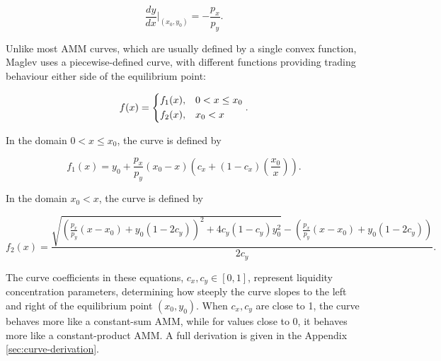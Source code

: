 \documentclass{article}
\begin{document}
\begin{equation}
\frac{dy}{dx} \Big|_{(x_0, y_0)} = -\frac{p_x}{p_y}.
\end{equation}

Unlike most AMM curves, which are usually defined by a single convex function, Maglev uses a piecewise-defined curve, with different functions providing trading behaviour either side of the equilibrium point:

\begin{equation}
    \label{eq:fx-main}
    f(x) =
    \begin{dcases}
        f_1(x), 
        & 0 < x \leq x_0 \\
        f_2(x), 
        & x_0 < x
    \end{dcases}.
\end{equation}

In the domain $0 < x \leq x_0$, the curve is defined by

\begin{equation}
    \label{eq:fx1-main}
    f_1(x) 
    =
    y_{0}+\frac{p_{x}}{p_{y}}\left(x_{0}-x\right)\left(c_{x}+\left(1-c_{x}\right)\left(\frac{x_{0}}{x}\right)\right).
\end{equation}

In the domain $x_0 < x$, the curve is defined by

\begin{equation}
    \label{eq:fx2-main}
    f_2(x) 
    =
    \frac{
        \sqrt{
            \left( \frac{p_x}{p_y} (x - x_0) + y_0 (1 - 2c_y) \right)^2 
            + 4c_y (1 - c_y) y_0^2
        } 
        - \left( \frac{p_x}{p_y} (x - x_0) + y_0 (1 - 2c_y) \right)
    }{2c_y}.
\end{equation}

 The curve coefficients in these equations, \( c_x, c_y \in [0, 1] \), represent liquidity concentration parameters, determining how steeply the curve slopes to the left and right of the equilibrium point $(x_0, y_0)$. When \( c_x, c_y \) are close to 1, the curve behaves more like a constant-sum AMM, while for values close to 0, it behaves more like a constant-product AMM. A full derivation is given in the Appendix \ref{sec:curve-derivation}.  
 
\end{document}
